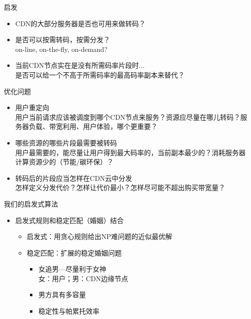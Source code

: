 \documentclass{beamer}
\begin{document}
\begin{frame}{启发}
\begin{itemize}
\item CDN的大部分服务器是否也可用来做转码？\\
\item 是否可以按需转码，按需分发？\\
on-line, on-the-fly, on-demand?
\item 当前CDN节点实在是没有所需码率片段时...\\
是否可以给一个不高于所需码率的最高码率副本来替代？
\end{itemize}
\end{frame}

\begin{frame}{优化问题}
\begin{itemize}
\item 用户重定向\\
用户当前请求应该被调度到哪个CDN节点来服务？资源应尽量在哪儿转码？服务器负载、带宽利用、用户体验，哪个更重要？
\item 哪些资源的哪些片段最需要被转码\\
用户最需要的，能尽量让用户得到最大码率的，当前副本最少的？消耗服务器计算资源少的（节能/碳环保）？
\item 转码后的片段应当怎样在CDN云中分发\\
怎样定义分发代价？怎样让代价最小？怎样尽可能不超出购买带宽量？
\end{itemize}
\end{frame}
\begin{frame}{我们的启发式算法}
\begin{itemize}
\item 启发式规则和稳定匹配（婚姻）结合
	\begin{itemize}
		\item 启发式：用贪心规则给出NP难问题的近似最优解
		\item 稳定匹配：扩展的稳定婚姻问题\\
			\begin{itemize}
					\item 女追男---尽量利于女神\\
						女：用户；男：CDN边缘节点
					\item 男方具有多容量
					\item 稳定性与帕累托效率
			\end{itemize}
	\end{itemize}
\end{itemize}
\end{frame}
\end{document}
